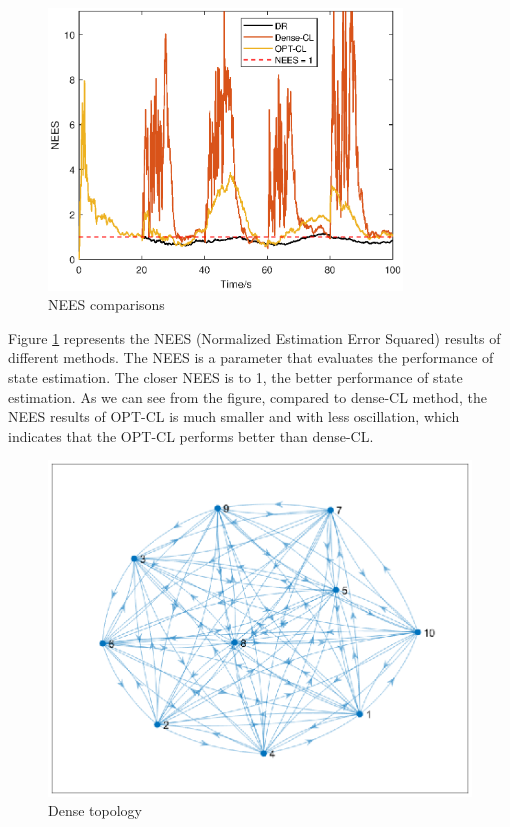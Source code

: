 \documentclass[conference]{IEEEtran}
\begin{document}
\begin{figure}
	\centering
	\includegraphics[width=3.7in]{Fig/fig5_nees.eps}
	\caption{NEES comparisons}
	\label{fig::nees}
\end{figure}

Figure \ref{fig::nees} represents the NEES (Normalized Estimation Error Squared) results of different methods. The NEES is a parameter that evaluates the performance of state estimation. The closer NEES is to 1, the better performance of state estimation.
As we can see from the figure, compared to dense-CL method, the NEES results of OPT-CL is much smaller and with less oscillation, which indicates that the OPT-CL performs better than dense-CL. 

\begin{figure}
	\centering
	\includegraphics[width=3.5 in]{Fig/topology_dense.eps}
	\caption{Dense topology}
	\label{fig::dense_topology}
\end{figure}
\end{document}
